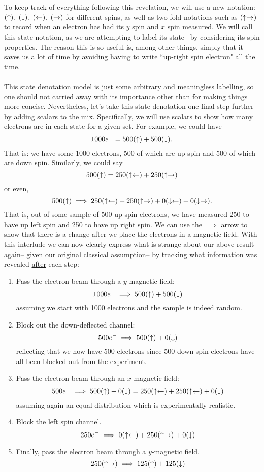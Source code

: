 \\\\
To keep track of everything following this revelation, we will use a new notation: $(\uparrow)$, $(\downarrow)$, $(\leftarrow)$, $(\rightarrow)$ for different spins, as well as two-fold notations such as $(\uparrow\rightarrow)$ to record when an electron has had its $y$ spin and $x$ spin measured. We will call this state notation,
as we are attempting to label its state-- by considering its spin properties. The reason this is so useful is, among other things, simply that it saves us a lot of time by avoiding having to write ``up-right spin electron" all the time.
\\\\
This state denotation model is just some arbitrary and meaningless labelling, so one should not carried away with its importance other than for making things more concise. Nevertheless, let's take this state denotation one final step further by adding scalars to the mix. Specifically, we will use scalars to show how many electrons are in each state for a given set. For example, we could have 
$$
1000e^{-}=500(\uparrow) + 500(\downarrow).
$$
That is: we have some 1000 electrons, 500 of which are up spin and 500 of which are down spin. Similarly, we could say 
$$
500(\uparrow) = 250(\uparrow\leftarrow) + 250(\uparrow\rightarrow)
$$
or even, 
$$
500(\uparrow) \implies 250(\uparrow\leftarrow) + 250(\uparrow\rightarrow) + 0(\downarrow\leftarrow) + 0(\downarrow\rightarrow).
$$
That is, out of some sample of 500 up spin electrons, we have measured 250 to have up left spin and 250 to have up right spin. We can use the $\implies$ arrow to show that there is a change after we place the electrons in a magnetic field. With this interlude we can now clearly express what is strange about our above result again-- given our original classical assumption-- by tracking what information was revealed \underline{after} each step:
\begin{enumerate}
    \item Pass the electron beam through a $y$-magnetic field:
    $$
    1000e^{-} \implies 500(\uparrow)+500(\downarrow)
    $$
    assuming we start with 1000 electrons and the sample is indeed random.
    \item Block out the down-deflected channel:
    $$
    500e^{-} \implies 500(\uparrow)+0(\downarrow)
    $$
    reflecting that we now have 500 electrons since 500 down spin electrons have all been blocked out from the experiment.
    \item Pass the electron beam through an $x$-magnetic field:
    $$
    500e^{-} \implies500(\uparrow)+0(\downarrow)=250(\uparrow\leftarrow)+250(\uparrow\leftarrow)+0(\downarrow)
    $$
    assuming again an equal distribution which is experimentally realistic.
    \item Block the left spin channel.
    $$
    250e^{-}\implies0(\uparrow\leftarrow)+ 250(\uparrow\rightarrow) + 0(\downarrow)
    $$
    \item Finally, pass the electron beam through a $y$-magnetic field.
    $$
    250(\uparrow\rightarrow)\implies125(\uparrow)+125(\downarrow)
    $$
\end{enumerate}
